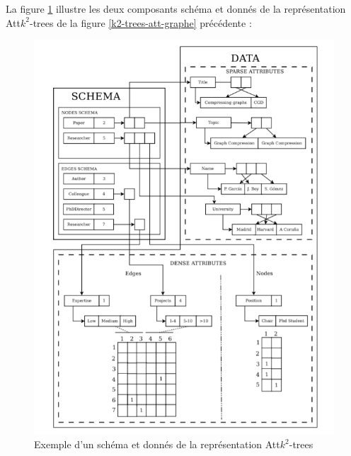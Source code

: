 \begin{itemize}
\begin{description}
\end{description}
La figure \ref{k2-trees-att-schema} illustre les deux composants schéma et donnés de la représentation Att$k^2$-trees  de la figure \ref{k2-trees-att-graphe} précédente \citep{alvarez2018compact}:
\begin{figure}[H]
\begin{center}
\includegraphics[height=200 pt, width=280 pt]{./ressources/image/k2-trees-att-schema.png} 
\end{center}
\caption{Exemple d'un schéma et donnés de la représentation Att$k^2$-trees}
\label{k2-trees-att-schema}
\end{figure}



\end{itemize}
